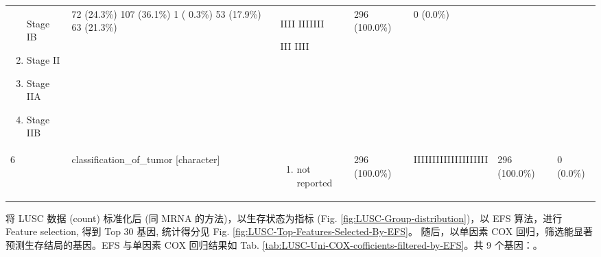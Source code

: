 \documentclass[
]{article}
\providecommand{\tightlist}{%
  \setlength{\itemsep}{0pt}\setlength{\parskip}{0pt}}
\begin{document}
\begin{longtable}[]{@{}lllllll@{}}
\begin{minipage}[t]{0.17\columnwidth}
\begin{enumerate}
  Stage IB
\item
  Stage II
\item
  Stage IIA
\item
  Stage IIB
\end{enumerate}\strut
\end{minipage} & \begin{minipage}[t]{0.14\columnwidth}\raggedright
72 (24.3\%)
107 (36.1\%)
1 ( 0.3\%)
53 (17.9\%)
63 (21.3\%)\strut
\end{minipage} & \begin{minipage}[t]{0.15\columnwidth}\raggedright
IIII
IIIIIII

III
IIII\strut
\end{minipage} & \begin{minipage}[t]{0.07\columnwidth}\raggedright
296
(100.0\%)\strut
\end{minipage} & \begin{minipage}[t]{0.07\columnwidth}\raggedright
0
(0.0\%)\strut
\end{minipage}\tabularnewline
\begin{minipage}[t]{0.03\columnwidth}\raggedright
6\strut
\end{minipage} & \begin{minipage}[t]{0.17\columnwidth}\raggedright
classification\_of\_tumor
{[}character{]}\strut
\end{minipage} & \begin{minipage}[t]{0.17\columnwidth}\raggedright
\begin{enumerate}
\def\labelenumi{\arabic{enumi}.}
\tightlist
\item
  not reported
\end{enumerate}\strut
\end{minipage} & \begin{minipage}[t]{0.14\columnwidth}\raggedright
296 (100.0\%)\strut
\end{minipage} & \begin{minipage}[t]{0.15\columnwidth}\raggedright
IIIIIIIIIIIIIIIIIIII\strut
\end{minipage} & \begin{minipage}[t]{0.07\columnwidth}\raggedright
296
(100.0\%)\strut
\end{minipage} & \begin{minipage}[t]{0.07\columnwidth}\raggedright
0
(0.0\%)\strut
\end{minipage}\tabularnewline
\bottomrule
\end{longtable}

将 LUSC 数据 (count) 标准化后 (同 MRNA 的方法)，以生存状态为指标 (Fig. \ref{fig:LUSC-Group-distribution})，以 EFS 算法，进行 Feature selection, 得到 Top 30 基因, 统计得分见 Fig. \ref{fig:LUSC-Top-Features-Selected-By-EFS}。
随后，以单因素 COX 回归，筛选能显著预测生存结局的基因。EFS 与单因素 COX 回归结果如 Tab. \ref{tab:LUSC-Uni-COX-cofficients-filtered-by-EFS}。共 9 个基因：。
\end{document}
